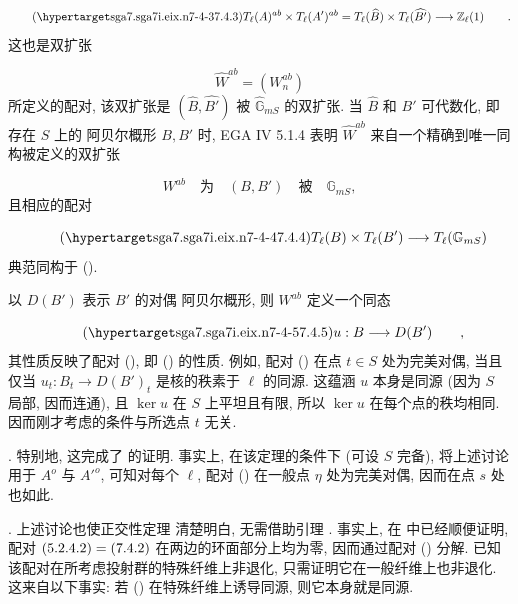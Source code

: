 \begin{equation}\tag{\SGARefTarget{sga7.sga7i.eix.n7-4-3}{7.4.3}}
T_{\ell}(A)^{ab} \times T_{\ell}(A')^{ab}
 = T_{\ell}(\widehat B) \times T_{\ell}(\widehat {B'})
 \longrightarrow \mathbb Z_{\ell}(1) \qquad .
\end{equation}
这也是双扩张

\begin{equation*}
\widehat W^{ab}=(W_n^{ab})
\end{equation*}
所定义的配对, 该双扩张是 $(\widehat B,\widehat {B'})$ 被 $\widehat{\mathbb G}_{mS}$ 的双扩张. 当 $\widehat B$ 和 $\widehat {B'}$ 可代数化, 即存在 $S$ 上的 阿贝尔概形 $B,B'$ 时, EGA IV 5.1.4 表明 $\widehat W^{ab}$ 来自一个精确到唯一同构被定义的双扩张

\begin{equation*}
W^{ab}\quad\text{为}\quad(B,B')\quad\text{被}\quad\mathbb G_{mS},
\end{equation*}
且相应的配对

\begin{equation}\tag{\SGARefTarget{sga7.sga7i.eix.n7-4-4}{7.4.4}}
T_{\ell}(B) \times T_{\ell}(B')
 \longrightarrow T_{\ell}(\mathbb G_{mS})
\end{equation}
典范同构于 ().

以 $D(B')$ 表示 $B'$ 的对偶 阿贝尔概形, 则 $W^{ab}$ 定义一个同态

\begin{equation}\tag{\SGARefTarget{sga7.sga7i.eix.n7-4-5}{7.4.5}}
u:B\longrightarrow D(B') \qquad ,
\end{equation}
其性质反映了配对 (), 即 () 的性质. 例如, 配对 () 在点 $t\in S$ 处为完美对偶, 当且仅当 $u_t:B_t\longrightarrow D(B')_t$ 是核的秩素于 $\ell$ 的同源. 这蕴涵 $u$ 本身是同源 (因为 $S$ 局部, 因而连通), 且 $\ker u$ 在 $S$ 上平坦且有限, 所以 $\ker u$ 在每个点的秩均相同. 因而刚才考虑的条件与所选点 $t$ 无关.

\medskip
\noindent
{}. 特别地, 这完成了  的证明. 事实上, 在该定理的条件下 (可设 $S$ 完备), 将上述讨论用于 $A^o$ 与 ${A'}^o$, 可知对每个 $\ell$, 配对 () 在一般点 $\eta$ 处为完美对偶, 因而在点 $s$ 处也如此.

\medskip
\noindent
{}. 上述讨论也使正交性定理  清楚明白, 无需借助引理 . 事实上, 在  中已经顺便证明, 配对 $(\SGARefLink{sga7.sga7i.eix.n5-2-4-2}{5.2.4.2})=(\SGARefLink{sga7.sga7i.eix.n7-4-2}{7.4.2})$ 在两边的环面部分上均为零, 因而通过配对 () 分解. 已知该配对在所考虑投射群的特殊纤维上非退化, 只需证明它在一般纤维上也非退化. 这来自以下事实: 若 () 在特殊纤维上诱导同源, 则它本身就是同源.

